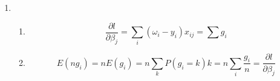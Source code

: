 \documentclass{article}
\begin{document}
\begin{enumerate}
\item
\begin{enumerate}[A]
\item
\[
\frac{\partial l}{\partial\beta_j}=\sum_i(\omega_i-y_i)x_{ij}=\sum g_i
\]
\item
\[
E(ng_i)=nE(g_i)=n\sum_kP(g_i=k)k=n\sum_i\frac{g_i}{n}=\frac{\partial l}{\partial\beta_j}
\]
\end{enumerate}
\end{enumerate}
\end{document}
